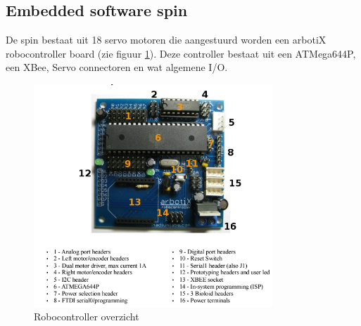 \documentclass[10pt,a4paper]{article}
\begin{document}
\subsection{Embedded software spin}
De spin bestaat uit 18 servo motoren die aangestuurd worden een 	arbotiX robocontroller board (zie figuur \ref{fig:robocontroller-overview}). Deze controller bestaat uit een ATMega644P, een XBee, Servo connectoren en wat algemene I/O.
\begin{figure}[h]
    \centering
    \includegraphics[width=0.8\textwidth]{robocontroller-overview.png}
    \caption{Robocontroller overzicht}
    \label{fig:robocontroller-overview}
\end{figure}
\end{document}
